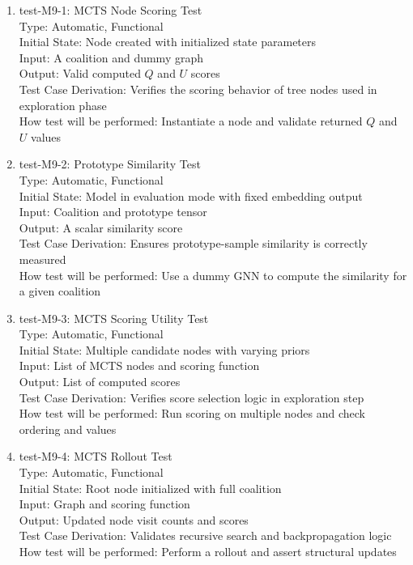 \documentclass[12pt, titlepage]{article}
\begin{document}
\begin{enumerate}

\item{test-M9-1: MCTS Node Scoring Test\\}
Type: Automatic, Functional \\
Initial State: Node created with initialized state parameters \\
Input: A coalition and dummy graph \\
Output: Valid computed $Q$ and $U$ scores \\
Test Case Derivation: Verifies the scoring behavior of tree nodes used in exploration phase \\
How test will be performed: Instantiate a node and validate returned $Q$ and $U$ values

\item{test-M9-2: Prototype Similarity Test\\}
Type: Automatic, Functional \\
Initial State: Model in evaluation mode with fixed embedding output \\
Input: Coalition and prototype tensor \\
Output: A scalar similarity score \\
Test Case Derivation: Ensures prototype-sample similarity is correctly measured \\
How test will be performed: Use a dummy GNN to compute the similarity for a given coalition

\item{test-M9-3: MCTS Scoring Utility Test\\}
Type: Automatic, Functional \\
Initial State: Multiple candidate nodes with varying priors \\
Input: List of MCTS nodes and scoring function \\
Output: List of computed scores \\
Test Case Derivation: Verifies score selection logic in exploration step \\
How test will be performed: Run scoring on multiple nodes and check ordering and values

\item{test-M9-4: MCTS Rollout Test\\}
Type: Automatic, Functional \\
Initial State: Root node initialized with full coalition \\
Input: Graph and scoring function \\
Output: Updated node visit counts and scores \\
Test Case Derivation: Validates recursive search and backpropagation logic \\
How test will be performed: Perform a rollout and assert structural updates


\end{enumerate}
\end{document}

